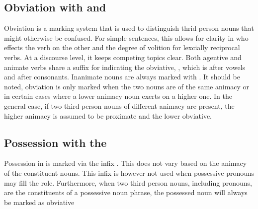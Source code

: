   \vertspace

  \subsection{Obviation with \suffixtext{\agtconsobv} and \suffixtext{\inanobv}}
  Obviation is a marking system that is used to distinguish thrid person nouns that might otherwise be confused.  For simple sentences, this allows for clarity in who effects the verb on the other and the degree of volition for lexcially reciprocal verbs. At a discourse level, it keeps competing topics clear. Both agentive and animate verbs share a suffix for indicating the obviative, \suffixtext{\agtobv}, which is \suffixtext{\agtvowelobv} after vowels and \suffixtext{\agtconsobv} after consonants. Inanimate nouns are always marked with \suffixtext{\inanobv}.
  It should be noted, obviation is only marked when the two nouns are of the same animacy or in certain cases where a lower animacy noun exerts on a higher one. In the general case, if two third person nouns of different animacy are present, the higher animacy is assumed to be proximate and the lower obviative.

  \subsection{Possession with the \infixtext{\possessive}}
  Possession in \langname is marked via the infix \infixtext{\possessive}. This does not vary based on the animacy of the constituent nouns. This infix is however not used when possessive pronouns may fill the role. Furthermore, when two third person nouns, including pronouns, are the constituents of a possessive noun phrase, the possessed noun will always be marked as obviative


